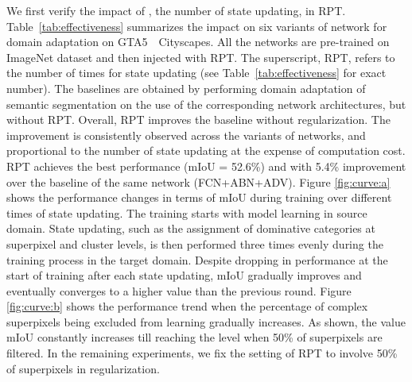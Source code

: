 \documentclass[10pt,twocolumn,letterpaper]{article}
\begin{document}
We first verify the impact of , the number of state updating, in RPT. Table~\ref{tab:effectiveness} summarizes the impact on six variants of network for domain adaptation on GTA5~~Cityscapes.
All the networks are pre-trained on ImageNet dataset and then injected with RPT.
The superscript, RPT, refers to the number of times for state updating (see Table~\ref{tab:effectiveness} for exact number).
The baselines are obtained by performing domain adaptation of semantic segmentation on the use of the corresponding network architectures, but without RPT.
Overall, RPT improves the baseline without regularization. The improvement is consistently observed across the variants of networks, and proportional to the number of state updating at the expense of computation cost. RPT achieves the best performance (mIoU = 52.6\%) and with 5.4\% improvement over the baseline of the same network (FCN+ABN+ADV). Figure \ref{fig:curve:a} shows the performance changes in terms of mIoU during training over different times of state updating. The training starts with model learning in source domain. State updating, such as the assignment of dominative categories at superpixel and cluster levels, is then performed three times evenly during the training process in the target domain.
Despite dropping in performance at the start of training after each state updating, mIoU gradually improves and eventually converges to a higher value than the previous round.
Figure \ref{fig:curve:b} shows the performance trend when the percentage of complex superpixels being excluded from learning gradually increases. As shown, the value mIoU constantly increases till reaching the level when 50\% of superpixels are filtered. In the remaining experiments, we fix the setting of RPT to involve 50\% of superpixels in regularization.
\end{document}
